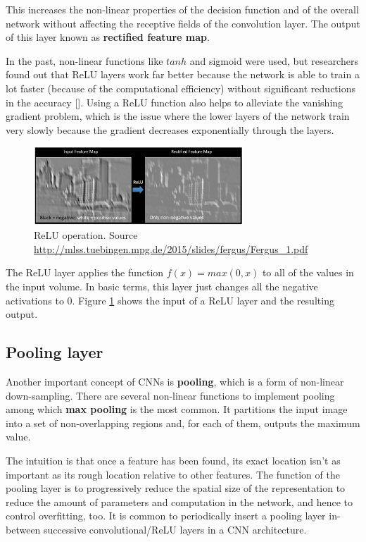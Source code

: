 This increases the non-linear properties of the decision function and of the overall network without affecting the receptive fields of the convolution layer. The output of this layer known as \textbf{rectified feature map}.

In the past, non-linear functions like $tanh$ and sigmoid were used, but researchers found out that \ac{ReLU} layers work far better because the network is able to train a lot faster (because of the computational efficiency) without significant reductions in the accuracy [\cite{icml2010_NairH10}]. Using a \ac{ReLU} function also helps to alleviate the vanishing gradient problem, which is the issue where the lower layers of the network train very slowly because the gradient decreases exponentially through the layers.

\begin{figure}
	\centering
	\includegraphics[width=0.7\textwidth]{Images/relu}
	\caption{\ac{ReLU} operation. Source \url{http://mlss.tuebingen.mpg.de/2015/slides/fergus/Fergus_1.pdf}}\label{fig:relu}
\end{figure}

The ReLU layer applies the function $f(x) = max(0, x)$ to all of the values in the input volume. In basic terms, this layer just changes all the negative activations to 0. Figure \ref{fig:relu} shows the input of a \ac{ReLU} layer and the resulting output.

\subsection{Pooling layer}

Another important concept of \acsp{CNN} is \textbf{pooling}, which is a form of non-linear down-sampling. There are several non-linear functions to implement pooling among which \textbf{max pooling} is the most common. It partitions the input image into a set of non-overlapping regions and, for each of them, outputs the maximum value.

The intuition is that once a feature has been found, its exact location isn't as important as its rough location relative to other features. The function of the pooling layer is to progressively reduce the spatial size of the representation to reduce the amount of parameters and computation in the network, and hence to control overfitting, too. It is common to periodically insert a pooling layer in-between successive convolutional/\acs{ReLU} layers in a \acs{CNN} architecture.

